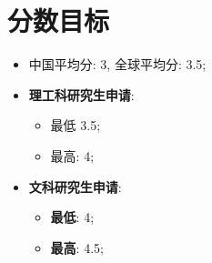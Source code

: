 \section{分数目标}

  \begin{itemize}
    \item 中国平均分: 3, 全球平均分: 3.5;
    \item \textbf{理工科研究生申请}:
    \begin{itemize}
      \item 最低 3.5;
      \item 最高: 4;
    \end{itemize}

    \item \textbf{文科研究生申请}:
    \begin{itemize}
      \item \textbf{最低}: 4;
      \item \textbf{最高}: 4.5;
    \end{itemize}
  \end{itemize}
